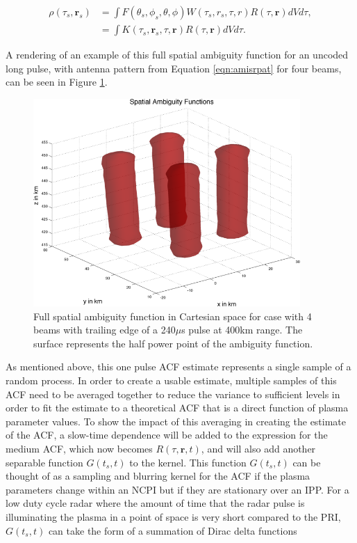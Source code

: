  \begin{align}
  \label{eqn:volume}
\rho(\tau_s,\mathbf{r}_s) &= \int F(\theta_s,\phi_s,\theta,\phi)W(\tau_s,r_s,\tau,r) R(\tau,\mathbf{r}) dV d\tau ,\\
	&= \int K(\tau_s,\mathbf{r}_s,\tau,\mathbf{r}) R(\tau,\mathbf{r})  dVd\tau.
\end{align}

A rendering of an example of this full spatial ambiguity function for an uncoded long pulse, with antenna pattern from Equation \ref{eqn:amisrpat} for four beams, can be seen in Figure \ref{fig:amb4}.

\begin{figure}
	\centering
	\includegraphics[width=4in]{spaceamb}
	\caption{Full spatial ambiguity function in Cartesian space for case with 4 beams with trailing edge of a 240$\mu$s pulse at 400km range. The surface represents the half power point of the ambiguity function.}	
	\label{fig:amb4}
\end{figure}

As mentioned above, this one pulse ACF estimate represents a single sample of a random process. In order to create a usable estimate, multiple samples of this ACF need to be averaged together to reduce the variance to sufficient levels in order to fit the estimate to a theoretical ACF that is a direct function of plasma parameter values. To show the impact of this averaging in creating the estimate of the ACF, a slow-time dependence will be added to the expression for the medium ACF, which now becomes $R(\tau,\mathbf{r},t)$, and will also add another separable function $G(t_s,t)$ to the kernel. This function $G(t_s,t)$ can be thought of as a sampling and blurring kernel for the ACF if the plasma parameters change within an NCPI but if they are stationary over an IPP. For a low duty cycle radar where the amount of time that the radar pulse is illuminating the plasma in a point of space is very short compared to the PRI, $G(t_s,t)$ can take the form of a summation of Dirac delta functions 

